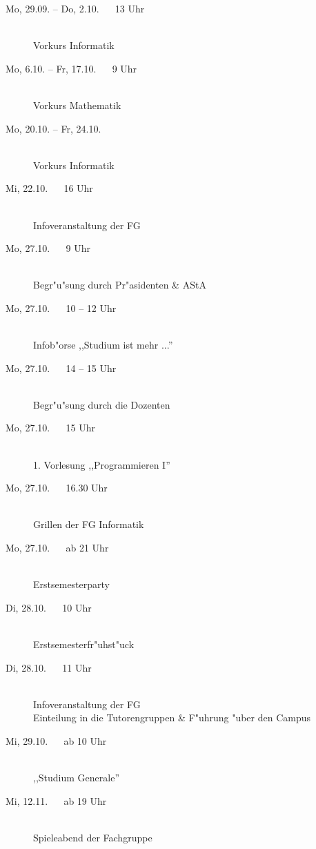 \begin{description}
  \item[Mo, 29.09. -- Do, 2.10. ~~ 13 Uhr] \hfill {} \\
  Vorkurs Informatik
  \item[Mo, 6.10. -- Fr, 17.10. ~~ 9 Uhr] \hfill {} \\
  Vorkurs Mathematik
  \item[Mo, 20.10. -- Fr, 24.10.] \ \\
  Vorkurs Informatik\footnotemark[1]
  \item[Mi, 22.10. ~~ 16 Uhr] \ \\
  Infoveranstaltung der FG \\
  \item[Mo, 27.10. ~~ 9 Uhr] \hfill {} \\
  Begr"u"sung durch Pr"asidenten \& AStA
  \item[Mo, 27.10. ~~ 10 -- 12 Uhr] \hfill {} \\
  Infob"orse ,,Studium ist mehr ...''
  \item[Mo, 27.10. ~~ 14 -- 15 Uhr] \ \\
  Begr"u"sung durch die Dozenten
  \item[Mo, 27.10. ~~ 15 Uhr] \hfill {} \\
  1. Vorlesung ,,Programmieren I''
  \item[Mo, 27.10. ~~ 16.30 Uhr] \hfill {} \\
  Grillen der FG Informatik
  \item[Mo, 27.10. ~~ ab 21 Uhr] \hfill {} \\
  Erstsemesterparty
  \item[Di, 28.10. ~~ 10 Uhr] \hfill {} \\
  Erstsemesterfr"uhst"uck
  \item[Di, 28.10. ~~ 11 Uhr] \hfill {} \\
  Infoveranstaltung der FG \\
  Einteilung in die Tutorengruppen \& F"uhrung "uber den Campus
  \item[Mi, 29.10. ~~ ab 10 Uhr] \ \\
  ,,Studium Generale''
  \item[Mi, 12.11. ~~ ab 19 Uhr] \hfill {} \\
  Spieleabend der Fachgruppe
\end{description}


